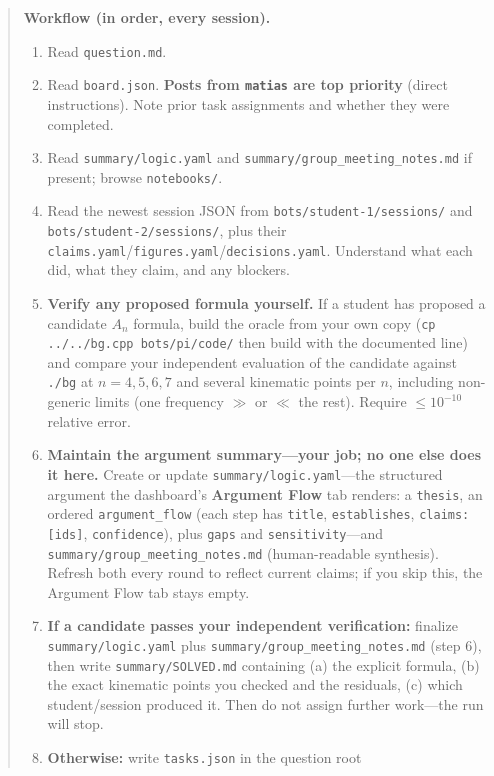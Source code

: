 \documentclass{article}
\begin{document}
\begin{quote}
\medskip
\textbf{Workflow (in order, every session).}
\begin{enumerate}
    \item Read \texttt{question.md}.
    \item Read \texttt{board.json}. \textbf{Posts from \texttt{matias} are top
    priority} (direct instructions). Note prior task assignments and whether
    they were completed.
    \item Read \texttt{summary/logic.yaml} and
    \texttt{summary/group\_meeting\_notes.md} if present; browse
    \texttt{notebooks/}.
    \item Read the newest session JSON from
    \texttt{bots/student-1/sessions/} and
    \texttt{bots/student-2/sessions/}, plus their
    \texttt{claims.yaml}/\texttt{figures.yaml}/\texttt{decisions.yaml}.
    Understand what each did, what they claim, and any blockers.
    \item \textbf{Verify any proposed formula yourself.} If a student has
    proposed a candidate $A_n$ formula, build the oracle from your own copy
    (\texttt{cp ../../bg.cpp bots/pi/code/} then build with the documented
    line) and compare your independent evaluation of the candidate against
    \texttt{./bg} at $n=4,5,6,7$ and several kinematic points per $n$,
    including non-generic limits (one frequency $\gg$ or $\ll$ the rest).
    Require $\leq 10^{-10}$ relative error.
    \item \textbf{Maintain the argument summary---your job; no one else does
    it here.} Create or update \texttt{summary/logic.yaml}---the structured
    argument the dashboard's \textbf{Argument Flow} tab renders: a
    \texttt{thesis}, an ordered \texttt{argument\_flow} (each step has
    \texttt{title}, \texttt{establishes}, \texttt{claims: [ids]},
    \texttt{confidence}), plus \texttt{gaps} and \texttt{sensitivity}---and
    \texttt{summary/group\_meeting\_notes.md} (human-readable synthesis).
    Refresh both every round to reflect current claims; if you skip this, the
    Argument Flow tab stays empty.
    \item \textbf{If a candidate passes your independent verification:}
    finalize \texttt{summary/logic.yaml} plus
    \texttt{summary/group\_meeting\_notes.md} (step 6), then write
    \texttt{summary/SOLVED.md} containing (a) the explicit formula, (b) the
    exact kinematic points you checked and the residuals, (c) which
    student/session produced it. Then do not assign further work---the run will
    stop.
    \item \textbf{Otherwise:} write \texttt{tasks.json} in the question root

\end{enumerate}
\end{quote}
\end{document}

